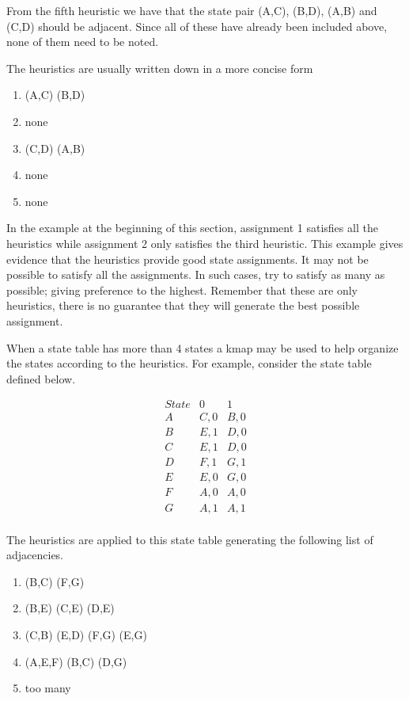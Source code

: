 From the fifth heuristic we have that the state pair (A,C),
(B,D), (A,B) and (C,D) should be adjacent.  Since all of these
have already been included above, none of them need to be noted.

The heuristics are usually written down in a more concise form
\begin{enumerate}
\item (A,C) (B,D)
\item none
\item (C,D) (A,B)
\item none
\item none
\end{enumerate}

In the example at the beginning of this section, assignment 1 satisfies
all the heuristics while assignment 2 only satisfies the third heuristic.
This example gives evidence that the heuristics provide good 
state assignments.  It may not be possible to satisfy all the
assignments.  In such cases, try to satisfy as many as possible;
giving preference to the highest.  Remember that these are only
heuristics, there is no guarantee that they will generate the best
possible assignment.

When a state table has more than 4 states a kmap may be used to help
organize the states according to the heuristics.  For example, 
consider the state table defined below.

$$ \begin{array} {c||c|c}
        State   & 0   & 1   \\ \hline
        A       & C,0  & B,0 \\ \hline
        B       & E,1  & D,0 \\ \hline
        C       & E,1  & D,0 \\ \hline
        D       & F,1  & G,1 \\ \hline
        E       & E,0  & G,0 \\ \hline
        F       & A,0  & A,0 \\ \hline
        G       & A,1  & A,1 \\ 
\end{array} $$

The heuristics are applied to this state table generating the following
list of adjacencies.

\begin{enumerate}
\item (B,C) (F,G)
\item (B,E) (C,E) (D,E)
\item (C,B) (E,D) (F,G) (E,G)
\item (A,E,F) (B,C) (D,G)
\item too many
\end{enumerate}

